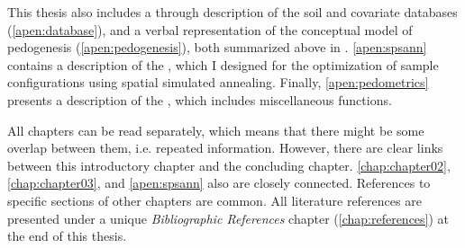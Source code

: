 This thesis also includes a through description of the soil and covariate databases 
(\autoref{apen:database}), and a verbal representation of the conceptual model of pedogenesis 
(\autoref{apen:pedogenesis}), both summarized above in . \autoref{apen:spsann} contains
a description of the , which I designed for the optimization of sample configurations
using spatial simulated annealing. Finally, \autoref{apen:pedometrics} presents a description of the 
, which includes miscellaneous functions.

All chapters can be read separately, which means that there might be some overlap between them, 
i.e. repeated information. However, there are clear links between this introductory chapter 
and the concluding chapter. \autoref{chap:chapter02}, \autoref{chap:chapter03}, and \autoref{apen:spsann} 
also are closely connected. References to specific sections of other chapters are common. All literature
references are presented under a unique \emph{Bibliographic References} chapter (\autoref{chap:references})
at the end of this thesis.
